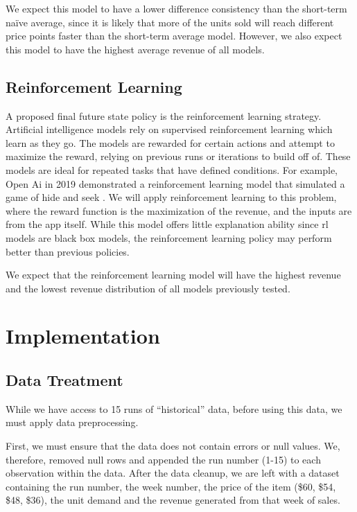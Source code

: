 \documentclass[11pt,a4paper]{article}
\begin{document}
We expect this model to have a lower difference consistency than the short-term naïve average, since it is likely that more of the units sold will reach different price points faster than the short-term average model. 
However, we also expect this model to have the highest average revenue of all models.

\subsection{Reinforcement Learning}
A proposed final future state policy is the reinforcement learning strategy. 
Artificial intelligence models rely on supervised reinforcement learning which learn as they go. 
The models are rewarded for certain actions and attempt to maximize the reward, relying on previous runs or iterations to build off of. 
These models are ideal for repeated tasks that have defined conditions. For example, Open Ai in 2019 demonstrated a reinforcement learning model that simulated a game of hide and seek \cite{baker2019emergent}. 
We will apply reinforcement learning to this problem, where the reward function is the maximization of the revenue, and the inputs are from the app itself. 
While this model offers little explanation ability since rl models are black box models, the reinforcement learning policy may perform better than previous policies.

We expect that the reinforcement learning model will have the highest revenue and the lowest revenue distribution of all models previously tested.

\section{Implementation}

\subsection{Data Treatment}
While we have access to 15 runs of “historical” data, before using this data, we must apply data preprocessing.
\pagebreak

First, we must ensure that the data does not contain errors or null values. 
We, therefore, removed null rows and appended the run number (1-15) to each observation within the data. 
After the data cleanup, we are left with a dataset containing the run number, the week number, the price of the item (\$60, \$54, \$48, \$36), the unit demand and the revenue generated from that week of sales.
\end{document}
